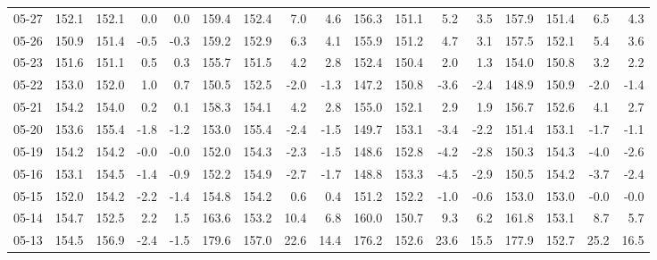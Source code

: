 \begin{threeparttable}
{\begin{tabular}{lrrrrrrrrrrrrrrrr}
  05-27 & 152.1 & 152.1 &        0.0 &            0.0 & 159.4 & 152.4 &        7.0 &            4.6 & 156.3 & 151.1 &        5.2 &            3.5 &  157.9 &  151.4 &         6.5 &              4.3 \\
  05-26 & 150.9 & 151.4 &       -0.5 &           -0.3 & 159.2 & 152.9 &        6.3 &            4.1 & 155.9 & 151.2 &        4.7 &            3.1 &  157.5 &  152.1 &         5.4 &              3.6 \\
  05-23 & 151.6 & 151.1 &        0.5 &            0.3 & 155.7 & 151.5 &        4.2 &            2.8 & 152.4 & 150.4 &        2.0 &            1.3 &  154.0 &  150.8 &         3.2 &              2.2 \\
  05-22 & 153.0 & 152.0 &        1.0 &            0.7 & 150.5 & 152.5 &       -2.0 &           -1.3 & 147.2 & 150.8 &       -3.6 &           -2.4 &  148.9 &  150.9 &        -2.0 &             -1.4 \\
  05-21 & 154.2 & 154.0 &        0.2 &            0.1 & 158.3 & 154.1 &        4.2 &            2.8 & 155.0 & 152.1 &        2.9 &            1.9 &  156.7 &  152.6 &         4.1 &              2.7 \\
  05-20 & 153.6 & 155.4 &       -1.8 &           -1.2 & 153.0 & 155.4 &       -2.4 &           -1.5 & 149.7 & 153.1 &       -3.4 &           -2.2 &  151.4 &  153.1 &        -1.7 &             -1.1 \\
  05-19 & 154.2 & 154.2 &       -0.0 &           -0.0 & 152.0 & 154.3 &       -2.3 &           -1.5 & 148.6 & 152.8 &       -4.2 &           -2.8 &  150.3 &  154.3 &        -4.0 &             -2.6 \\
  05-16 & 153.1 & 154.5 &       -1.4 &           -0.9 & 152.2 & 154.9 &       -2.7 &           -1.7 & 148.8 & 153.3 &       -4.5 &           -2.9 &  150.5 &  154.2 &        -3.7 &             -2.4 \\
  05-15 & 152.0 & 154.2 &       -2.2 &           -1.4 & 154.8 & 154.2 &        0.6 &            0.4 & 151.2 & 152.2 &       -1.0 &           -0.6 &  153.0 &  153.0 &        -0.0 &             -0.0 \\
  05-14 & 154.7 & 152.5 &        2.2 &            1.5 & 163.6 & 153.2 &       10.4 &            6.8 & 160.0 & 150.7 &        9.3 &            6.2 &  161.8 &  153.1 &         8.7 &              5.7 \\
  05-13 & 154.5 & 156.9 &       -2.4 &           -1.5 & 179.6 & 157.0 &       22.6 &           14.4 & 176.2 & 152.6 &       23.6 &           15.5 &  177.9 &  152.7 &        25.2 &             16.5 \\

\end{tabular}}
\end{threeparttable}
